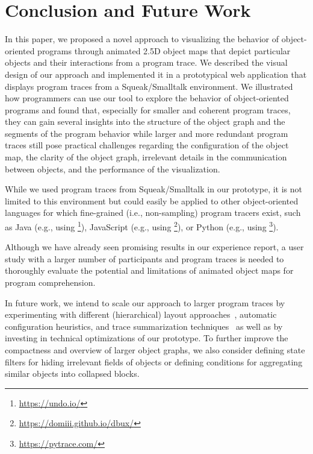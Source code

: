 \section{Conclusion and Future Work}
\label{sec:conclusion}

In this paper, we proposed a novel approach to visualizing the behavior of object-oriented programs through animated 2.5D object maps that depict particular objects and their interactions from a program trace.
We described the visual design of our approach and implemented it in a prototypical web application that displays program traces from a Squeak/Smalltalk environment.
We illustrated how programmers can use our tool to explore the behavior of object-oriented programs and found that, especially for smaller and coherent program traces, they can gain several insights into the structure of the object graph and the segments of the program behavior while larger and more redundant program traces still pose practical challenges regarding the configuration of the object map, the clarity of the object graph, irrelevant details in the communication between objects, and the performance of the visualization.

While we used program traces from Squeak/Smalltalk in our prototype, it is not limited to this environment but could easily be applied to other object-oriented languages for which fine-grained (i.e., non-sampling) program tracers exist, such as Java (e.g., using \footnote{\url{https://undo.io/}}), JavaScript (e.g., using \footnote{\url{https://domiii.github.io/dbux/}}), or Python (e.g., using \footnote{\url{https://pytrace.com/}}).

Although we have already seen promising results in our experience report, a user study with a larger number of participants and program traces is needed to thoroughly evaluate the potential and limitations of animated object maps for program comprehension.

In future work, we intend to scale our approach to larger program traces by experimenting with different (hierarchical) layout approaches~\cite{kuhn2008consistent,atzberger2023visualization}, automatic configuration heuristics, and trace summarization techniques~\cite{hamouLhadj2006summarizing,noda2017identifying} as well as by investing in technical optimizations of our prototype.
To further improve the compactness and overview of larger object graphs, we also consider defining state filters for hiding irrelevant fields of objects or defining conditions for aggregating similar objects into collapsed blocks.

